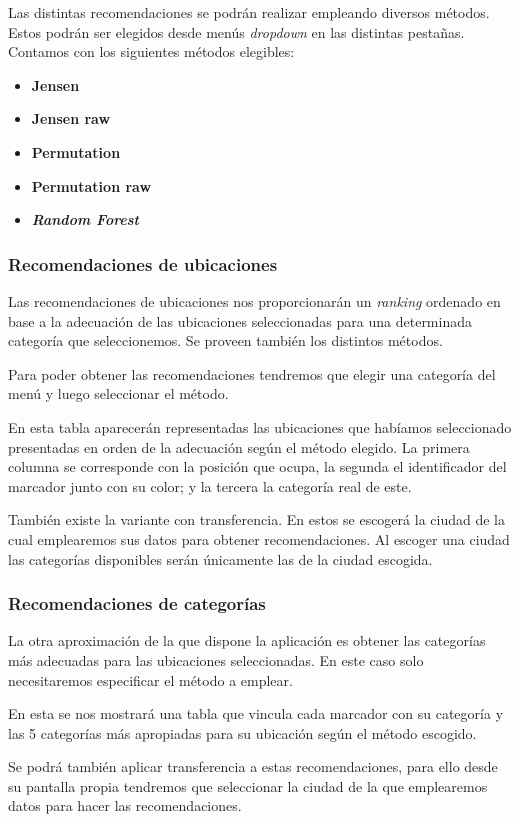 Las distintas recomendaciones se podrán realizar empleando diversos métodos. Estos podrán ser elegidos desde menús \textit{dropdown} en las distintas pestañas. Contamos con los siguientes métodos elegibles:

\begin{itemize}
	\item \textbf{Jensen}
	\item \textbf{Jensen raw}
	\item \textbf{Permutation}
	\item \textbf{Permutation raw}
	\item \textbf{\textit{Random Forest}}
\end{itemize}



\subsubsection{Recomendaciones de ubicaciones}

Las recomendaciones de ubicaciones nos proporcionarán un \textit{ranking} ordenado en base a la adecuación de las ubicaciones seleccionadas para una determinada categoría que seleccionemos. Se proveen también los distintos métodos.

Para poder obtener las recomendaciones tendremos que elegir una categoría del menú y luego seleccionar el método.


En esta tabla aparecerán representadas las ubicaciones que habíamos seleccionado presentadas en orden de la adecuación según el método elegido. La primera columna se corresponde con la posición que ocupa, la segunda el identificador del marcador junto con su color; y la tercera la categoría real de este.

También existe la variante con transferencia. En estos se escogerá la ciudad de la cual emplearemos sus datos para obtener recomendaciones. Al escoger una ciudad las categorías disponibles serán únicamente las de la ciudad escogida.

\subsubsection{Recomendaciones de categorías}

La otra aproximación de la que dispone la aplicación es obtener las categorías más adecuadas para las ubicaciones seleccionadas. En este caso solo necesitaremos especificar el método a emplear.


En esta se nos mostrará una tabla que vincula cada marcador con su categoría y las 5 categorías más apropiadas para su ubicación según el método escogido.

Se podrá también aplicar transferencia a estas recomendaciones, para ello desde su pantalla propia tendremos que seleccionar la ciudad de la que emplearemos datos para hacer las recomendaciones.
